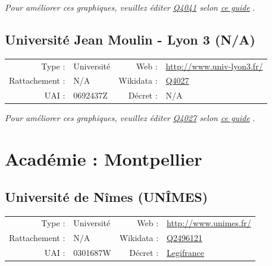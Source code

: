 \documentclass[11pt,french,landscape]{article}
\begin{document}
\textit{\scriptsize Pour améliorer ces graphiques, veuillez éditer \href{https://www.wikidata.org/entity/Q4041}{Q4041}  selon \href{https://github.com/cpesr/wikidataESR/blob/master/Rmd/wikidataESR.md}{ce guide}}
.


\newpage

\hypertarget{universituxe9-jean-moulin---lyon-3-na}{%
\subsection{Université Jean Moulin - Lyon 3
(N/A)}\label{universituxe9-jean-moulin---lyon-3-na}}

\begin{tabular*}{0.45\textwidth}{rp{2cm}rl}  
\hline  
Type : & Université & Web : &\href{http://www.univ-lyon3.fr/}{http://www.univ-lyon3.fr/} \\  
Rattachement : & N/A & Wikidata : & \href{https://www.wikidata.org/entity/Q4027}{Q4027} \\  
UAI : & 0692437Z & Décret : & N/A \\  
\hline  
\end{tabular*}

\textit{\scriptsize Pour améliorer ces graphiques, veuillez éditer \href{https://www.wikidata.org/entity/Q4027}{Q4027}  selon \href{https://github.com/cpesr/wikidataESR/blob/master/Rmd/wikidataESR.md}{ce guide}}
.


\newpage

\hypertarget{acaduxe9mie-montpellier}{%
\section{Académie : Montpellier}\label{acaduxe9mie-montpellier}}

\hypertarget{universituxe9-de-nuxeemes-unuxeemes}{%
\subsection{Université de Nîmes
(UNÎMES)}\label{universituxe9-de-nuxeemes-unuxeemes}}

\begin{tabular*}{0.45\textwidth}{rp{2cm}rl}  
\hline  
Type : & Université & Web : &\href{http://www.unimes.fr/}{http://www.unimes.fr/} \\  
Rattachement : & N/A & Wikidata : & \href{https://www.wikidata.org/entity/Q2496121}{Q2496121} \\  
UAI : & 0301687W & Décret : & \href{http://www.legifrance.gouv.fr/affichTexte.do;jsessionid=3976DDB631865D070704985BB39F3EC7.tpdjo05v_1?cidTexte=JORFTEXT000025790064&categorieLien=id}{Legifrance} \\  
\hline  
\end{tabular*}
\end{document}
